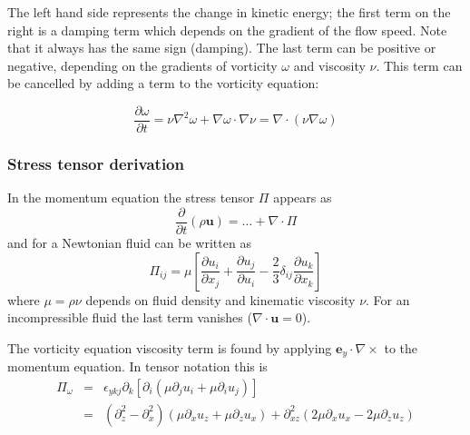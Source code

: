 \documentclass[12pt,a4paper]{article}
\newcommand{\deriv}[2]{\frac{\partial #1}{\partial #2}}
\newcommand{\lr}[1]{\left( #1 \right)}
\newcommand{\slr}[1]{\left[ #1 \right]}
\newcommand{\ey}{\ensuremath{\mathbf{e}_y}}
\begin{document}
The left hand side represents the change in kinetic energy; the first term on the right
is a damping term which depends on the gradient of the flow speed.
Note that it always has the same sign (damping). The last term can be positive
or negative, depending on the gradients of vorticity
$\omega$ and viscosity $\nu$. This term can be cancelled by adding a term
to the vorticity equation:

\begin{equation}
  \frac{\partial\omega}{\partial t} = \nu\nabla^2\omega + \nabla\omega\cdot\nabla\nu = \nabla\cdot\left(\nu \nabla\omega\right)
  \label{eq:vorticity_visc1}
\end{equation}

\subsubsection{Stress tensor derivation}

In the momentum equation the stress tensor $\Pi$ appears as
\begin{equation}
\frac{\partial}{\partial t}\left(\rho \mathbf{u}\right) = \ldots + \nabla\cdot\Pi 
\end{equation}
and for a Newtonian fluid can be written as
\begin{equation}
  \Pi_{ij} = \mu\slr{\deriv{u_i}{x_j} + \deriv{u_j}{u_i} - \frac{2}{3}\delta_{ij} \deriv{u_k}{x_k}}
\end{equation}
where $\mu = \rho\nu$ depends on fluid density and kinematic viscosity $\nu$.
For an incompressible fluid the last term vanishes ($\nabla\cdot\mathbf{u} = 0$).

The vorticity equation viscosity term is found by applying
$\ey\cdot\nabla\times$ to the momentum equation. In tensor notation
this is
\begin{eqnarray}
  \Pi_\omega &=& \epsilon_{ykj}\partial_k\slr{\partial_i\lr{\mu \partial_j u_i
                                            + \mu \partial_i u_j}} \\
  &=& \lr{\partial_z^2 - \partial_x^2}\lr{\mu\partial_x u_z + \mu \partial_z u_x} + \partial_{xz}^2\lr{2\mu\partial_x u_x - 2\mu \partial_zu_z}
\end{eqnarray}
\end{document}
